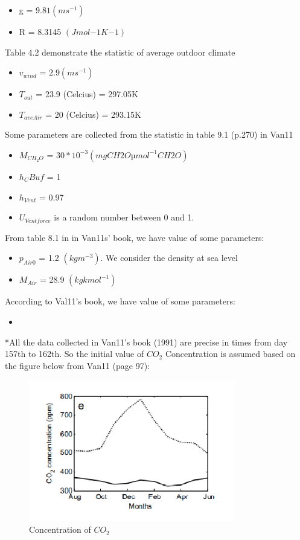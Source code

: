 \documentclass[a4paper]{article}
\numberwithin{equation}{section}
\begin{document}
\begin{itemize}
    \item g = $9.81 (ms^{-1})$
    \item R = 8.3145 $(Jmol{-1}K{-1})$
\end{itemize}
Table 4.2 demonstrate the statistic of average outdoor climate
\begin{itemize}
    \item $v_{wind}$ = $2.9 (ms^{-1})$
    \item $T_{out}$ = 23.9 (Celcius) = 297.05K
    \item $T_{aveAir}$ = 20 (Celcius) = 293.15K
\end{itemize}
Some parameters are collected from the statistic in table 9.1 (p.270) in Van11
\begin{itemize}
    \item $M_{CH_2O}$ = $30*10^{-3} (mg{CH2O}µmol^{-1}{CH2O})$
    \item $h_CBuf$ = 1
    \item $h_{Vent}$ = 0.97
    \item $U_{Ventforce}$ is a random number between 0 and 1.
\end{itemize}
From table 8.1 in  in Van11s' book, we have value of some parameters:
\begin{itemize}
    \item $p_{Air0}$ = 1.2 $(kgm^{-3})$. We consider the density at sea level
    \item $M_{Air}$ = 28.9 $(kgkmol^{-1})$
\end{itemize}

According to Val11's book, we have value of some parameters:
\begin{itemize}
    \item 
\end{itemize}


*All the data collected in Van11's book (1991) are precise in times from day 157th to 162th. So the initial value of $CO_2$ Concentration is assumed based on the figure below from Van11 (page 97): 
\begin{figure}[H]
  \centering
  \includegraphics[width=9cm]{CO2Concentration.png}
  \caption{Concentration of $CO_2$}\label{fig:Concentration}
\end{figure}
\end{document}
